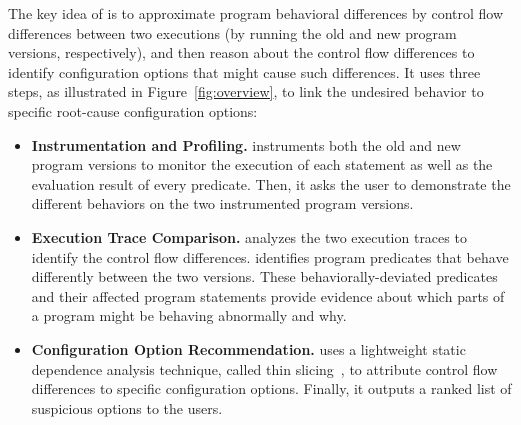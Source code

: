 
The key idea of \ourtool is to approximate program behavioral
differences by control flow differences between 
two executions (by running the old
and new program versions, respectively),
and then reason about the control flow differences to
identify configuration options that
might cause such differences. It uses
three steps, as illustrated in Figure~\ref{fig:overview},  to link the undesired
behavior to specific root-cause configuration options:


\begin{itemize}


\item \textbf{Instrumentation and Profiling.} \ourtool
instruments both the old and new program versions to
monitor the execution of each statement as well as the
evaluation result of every predicate. Then, it asks the user to
demonstrate the different behaviors on the two instrumented
program versions. 

\item \textbf{Execution Trace Comparison.}
\ourtool analyzes the two execution traces to identify
the control flow differences. \ourtool
identifies program predicates that behave
differently between the two versions. These
behaviorally-deviated predicates and their
affected program statements
provide evidence about which parts of a program might
be behaving abnormally and why.

\item \textbf{Configuration Option Recommendation.} 
\ourtool uses a lightweight static dependence analysis
technique, called thin slicing~\cite{Sridharan:2007}, to attribute
control flow differences to specific configuration options.
Finally, it outputs a ranked list of suspicious options to the users.


\end{itemize}


